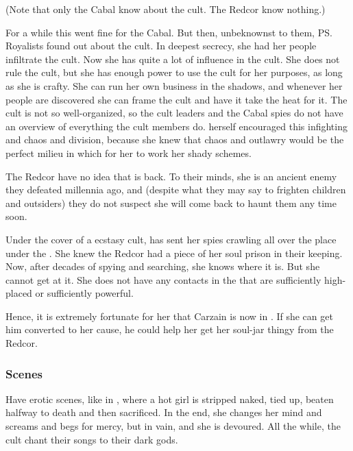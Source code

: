 (Note that only the Cabal know about the cult. The Redcor know nothing.) 

For a while this went fine for the Cabal. 
But then, unbeknownst to them, \ps{\Shiaraid} Royalists found out about the cult. 
In deepest secrecy, she had her people infiltrate the cult. 
Now she has quite a lot of influence in the cult. 
She does not rule the cult, but she has enough power to use the cult for her purposes, as long as she is crafty. 
She can run her own business in the shadows, and whenever her people are discovered she can frame the cult and have it take the heat for it. 
The cult is not so well-organized, so the cult leaders and the Cabal spies do not have an overview of everything the cult members do. 
\Shiaraid{} herself encouraged this infighting and chaos and division, because she knew that chaos and outlawry would be the perfect milieu in which for her to work her shady schemes. 

The Redcor have no idea that \Shiaraid{} is back. 
To their minds, she is an ancient enemy they defeated millennia ago, and (despite what they may say to frighten children and outsiders) they do not suspect she will come back to haunt them any time soon. 

Under the cover of a  ecstasy cult, \Shiaraid{} has sent her spies crawling all over the place under the \TopazChateau{}. 
She knew the Redcor had a piece of her soul prison in their keeping. 
Now, after decades of spying and searching, she knows where it is. 
But she cannot get at it. 
She does not have any contacts in the \Chateau{} that are sufficiently high-placed or sufficiently powerful. 

Hence, it is extremely fortunate for her that Carzain is now in \Redce. 
If she can get him converted to her cause, he could help her get her soul-jar thingy from the Redcor. 





\subsubsection{Scenes}
Have erotic scenes, like in \cite{GaryMyers:TheHorrorShow}, where a hot girl is stripped naked, tied up, beaten halfway to death and then sacrificed. 
In the end, she changes her mind and screams and begs for mercy, but in vain, and she is devoured. 
All the while, the cult chant their songs to their dark gods. 









